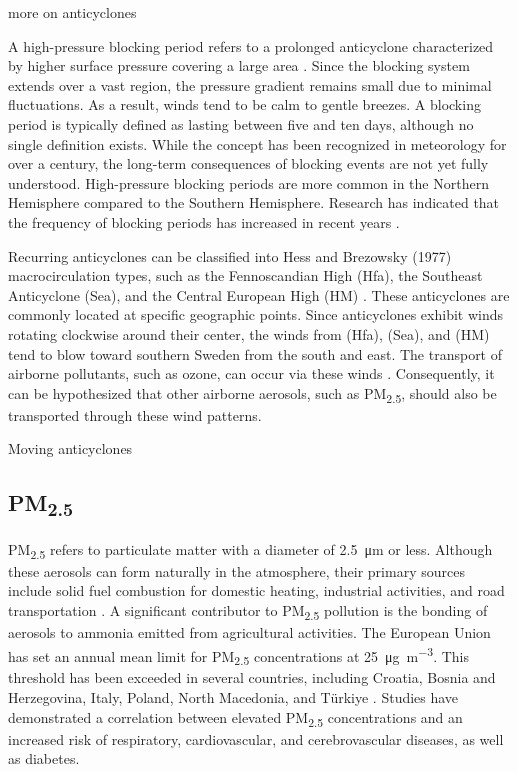 more on anticyclones

A high-pressure blocking period refers to a prolonged anticyclone characterized by higher surface pressure covering a large area \cite{Lupo2020}. Since the blocking system extends over a vast region, the pressure gradient remains small due to minimal fluctuations. As a result, winds tend to be calm to gentle breezes. A blocking period is typically defined as lasting between five and ten days, although no single definition exists. While the concept has been recognized in meteorology for over a century, the long-term consequences of blocking events are not yet fully understood. High-pressure blocking periods are more common in the Northern Hemisphere compared to the Southern Hemisphere. Research has indicated that the frequency of blocking periods has increased in recent years \cite{Lupo2020}. 

Recurring anticyclones can be classified into Hess and Brezowsky (1977) macrocirculation types, such as the Fennoscandian High (Hfa), the Southeast Anticyclone (Sea), and the Central European High (HM) \cite{Bartholy2006}. These anticyclones are commonly located at specific geographic points. Since anticyclones exhibit winds rotating clockwise around their center, the winds from (Hfa), (Sea), and (HM) tend to blow toward southern Sweden from the south and east. The transport of airborne pollutants, such as ozone, can occur via these winds \cite{Otero2022}. Consequently, it can be hypothesized that other airborne aerosols, such as PM\textsubscript{2.5}, should also be transported through these wind patterns.

Moving anticyclones

\subsection{PM\textsubscript{2.5}}
PM\textsubscript{2.5} refers to particulate matter with a diameter of \SI{2.5}{\micro\meter} or less. Although these aerosols can form naturally in the atmosphere, their primary sources include solid fuel combustion for domestic heating, industrial activities, and road transportation \cite{EEA2024}. A significant contributor to PM\textsubscript{2.5} pollution is the bonding of aerosols to ammonia emitted from agricultural activities. The European Union has set an annual mean limit for PM\textsubscript{2.5} concentrations at \SI{25}{\micro\gram\per\cubic\meter}. This threshold has been exceeded in several countries, including Croatia, Bosnia and Herzegovina, Italy, Poland, North Macedonia, and Türkiye \cite{EEA2024}. Studies have demonstrated a correlation between elevated PM\textsubscript{2.5} concentrations and an increased risk of respiratory, cardiovascular, and cerebrovascular diseases, as well as diabetes.

